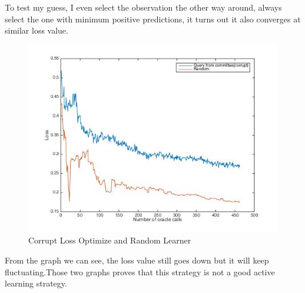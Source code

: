 \documentclass{article}
\begin{document}
To test my guess, I even select the observation the other way around, always select the one with minimum positive predictions, it turns out it also converges at similar loss value.
\begin{figure}[H]
\centering
\includegraphics[scale=0.5]{pool_based_loss_rank_corrupt_random}
\caption{Corrupt Loss Optimize and Random Learner}
\end{figure}
From the graph we can see, the loss value still goes down but it will keep fluctuating.Those two graphs proves that this strategy is not a good active learning strategy.
\end{document}
